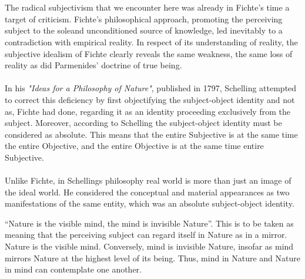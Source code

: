 \documentclass[10pt,a4paper]{article}
\begin{document}
                    \\
                    \\
                    The radical subjectivism that we encounter here was already in Fichte's time a target of criticism. Fichte's philosophical approach, promoting the perceiving subject to the soleand unconditioned source of knowledge, led inevitably to a contradiction with empirical reality. In respect of its understanding of reality, the subjective idealism of Fichte clearly reveals the same weakness, the same loss of reality as did Parmenides' doctrine of true being.
                    \\
                    \\
                    In his \textit{"Ideas for a Philosophy of Nature"}, published in 1797, Schelling attempted to correct this deficiency by first objectifying the subject-object identity and not as, Fichte had done, regarding it as an identity proceeding exclusively from the subject. Moreover, according to Schelling the subject-object identity must be considered as absolute. This means that the entire Subjective is at the same time the entire Objective, and the entire Objective is at the same time entire Subjective.
                    \\
                    \\
                    Unlike Fichte, in Schellings philosophy real world is more than just an image of the ideal world. He considered the conceptual and material appearances as two manifestations of the same entity, which was an absolute subject-object identity.
                \begin{qt}
                    “Nature is the visible mind, the mind is invisible Nature”. This is to be taken as meaning that the perceiving subject can regard itself in Nature as in a mirror. Nature is the visible mind. Conversely, mind is invisible Nature, insofar as mind mirrors Nature at the highest level of its being. Thus, mind in Nature and Nature in mind can contemplate one another.
                \end{qt}
\end{document}

